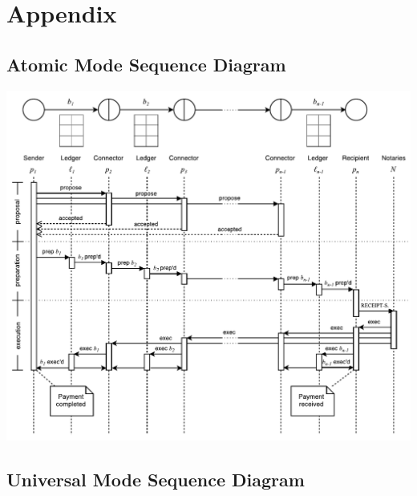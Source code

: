 \documentclass[letterpaper,twocolumn,10pt]{article}
\begin{document}
{\footnotesize 
}


\clearpage
\appendix
\section{Appendix}


\subsection{Atomic Mode Sequence Diagram}
\label{sec:atomic-sequence}

\begin{minipage}{\textwidth}
    \centering
    \includegraphics[width=\textwidth]{figures/atomic-sequence.pdf}
\end{minipage}

\clearpage


\subsection{Universal Mode Sequence Diagram}
\label{sec:universal-sequence}
\end{document}
